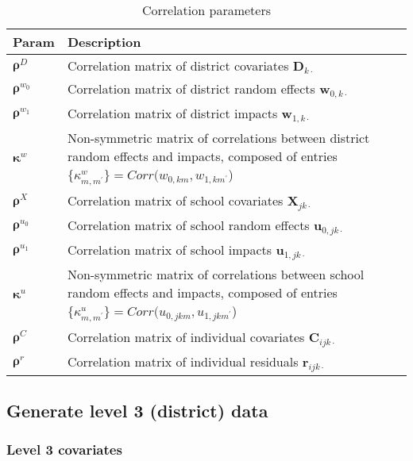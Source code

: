 \documentclass[12pt]{article}
\newcommand\mb[1]{\boldsymbol{#1}}
\begin{document}

\begin{table}[ht!]
\begin{tabular}{p{1.5cm} | p{15cm}}
Param											& Description \\ \hline
$\mb{\rho}^D$									& Correlation matrix of district covariates $\mb{D}_{k\cdot}$ \\
$\mb{\rho}^{w_0}$								& Correlation matrix of district random effects $\mb{w}_{0,k\cdot}$ \\
$\mb{\rho}^{w_1}$								& Correlation matrix of district impacts $\mb{w}_{1,k\cdot}$\\
$\boldsymbol{\kappa}^{w}$						& Non-symmetric matrix of correlations between district random effects and impacts, composed of entries $\{\kappa_{m,m^\prime}^{w}\} = Corr(w_{0,km}, w_{1,km^\prime}$) \\ \hline
$\mb{\rho}^X$									& Correlation matrix of school covariates $\mb{X}_{jk\cdot}$\\
$\mb{\rho}^{u_0}$								& Correlation matrix of school random effects $\mb{u}_{0,jk\cdot}$\\
$\mb{\rho}^{u_1}$								& Correlation matrix of school impacts $\mb{u}_{1,jk\cdot}$\\
$\boldsymbol{\kappa}^{u}$						& Non-symmetric matrix of correlations between school random effects and impacts, composed of entries $\{\kappa_{m,m^\prime}^{u}\} = Corr(u_{0,jkm}, u_{1,jkm^\prime}$) \\ \hline
$\mb{\rho}^C$									& Correlation matrix of individual covariates $\mb{C}_{ijk\cdot}$\\
$\mb{\rho}^r$									& Correlation matrix of individual residuals $\mb{r}_{ijk\cdot}$
\end{tabular}
\label{tab:corr_param}
\caption{Correlation parameters}
\end{table}


\subsection{Generate level 3 (district) data}

\subsubsection{Level 3 covariates}
\end{document}
